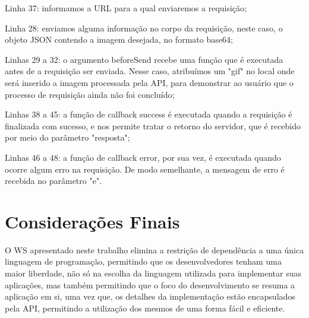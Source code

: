 \documentclass[12pt]{article}
\begin{document}
Linha 37: informamos a URL para a qual enviaremos a requisição;

Linha 28: enviamos alguma informação no corpo da requisição, neste caso, o objeto JSON contendo a imagem desejada, no formato base64;

Linhas 29 a 32: o argumento beforeSend recebe uma função que é executada antes de a requisição ser enviada. Nesse caso, atribuímos um "gif" no local onde será inserido a imagem processada pela API, para demonstrar ao usuário que o processo de requisição ainda não foi concluído;

Linhas 38 a 45: a função de callback success é executada quando a requisição é finalizada com sucesso, e nos permite tratar o retorno do servidor, que é recebido por meio do parâmetro "resposta";

Linhas 46 a 48: a função de callback error, por sua vez, é executada quando ocorre algum erro na requisição. De modo semelhante, a mensagem de erro é recebida no parâmetro "e".

\section{Considerações Finais}



O WS apresentado neste trabalho elimina a restrição de dependência a uma
única linguagem de programação, permitindo que os desenvolvedores tenham uma maior
liberdade, não só na escolha da linguagem utilizada para implementar suas aplicações,
mas também permitindo que o foco do desenvolvimento se resuma a aplicação em si,
uma vez que, os detalhes da implementação estão encapsulados pela API,
permitindo a utilização dos mesmos de uma forma fácil e eficiente.
\end{document}

